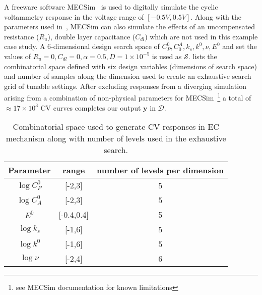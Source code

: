 A freeware software MECSim~\cite{kennedy2015monash,MECSim} is used to digitally simulate the cyclic voltammetry response in the voltage range of \([-0.5V,0.5V]\). 
Along with the parameters used in~, MECSim can also simulate the effects of an uncompensated resistance (\(R_u\)), double layer capacitance (\(C_{dl}\)) which are not used in this example case study. 
A 6-dimensional design search space of \(C_P^0, C^A_0, k_{s}, k^0, \nu, E^0\) and set the values of \(R_u = 0, C_{dl} = 0, \alpha=0.5, D=1\times10^{-5}\) is used as \(\mathcal{S}\). 
 lists the combinatorial space defined with six design variables (dimensions of search space) and number of samples along the dimension used to create an exhaustive search grid of tunable settings.
After excluding responses from a diverging simulation arising from a combination of non-physical parameters for MECSim~\footnote{see MECSim documentation for known limitations} a total of \(\approx 17\times10^3\) CV curves completes our output \(\textbf{y}\) in \(\mathcal{D}\). 
\begin{table}[h]
\centering
\begin{tabular}{|c|c|c|}
\hline
Parameter & range & number of levels per dimension \\  \hline
\(\log C_P^0 \) &[-2,3] & 5\\ \hline
\(\log C_A^0 \) &[-2,3] & 5\\ \hline
\( E^0 \) &[-0.4,0.4] & 5\\ \hline
\(\log k_{s} \) &[-1,6] & 5\\ \hline
\(\log k^0 \) &[-1,6] & 5\\ \hline
\(\log \nu \) &[-2,4] & 6\\ \hline
\end{tabular}
     \caption{Combinatorial space used to generate CV responses in EC mechanism along with number of levels used in the exhaustive search.}
     \label{tab:search_space}
 \end{table}
 

